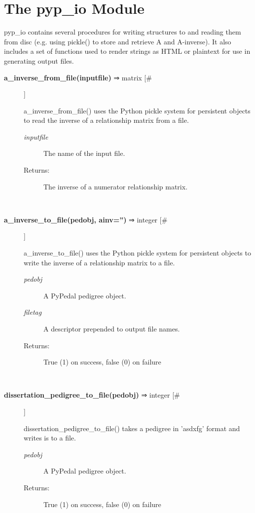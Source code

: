 \documentclass{article}
\begin{document}
\section*{The pyp\_io Module}
\par pyp\_io contains several procedures for writing structures to and reading them from
disc (e.g. using pickle() to store and retrieve A and A-inverse).  It also includes a set
of functions used to render strings as HTML or plaintext for use in generating output
files.
\begin{description}
\item[\textbf{a\_inverse\_from\_file(inputfile)} ⇒ matrix [\#]
]
\par a\_inverse\_from\_file() uses the Python pickle system for persistent objects to read the inverse of
a relationship matrix from a file.
\begin{description}
\item[\textit{inputfile}
]
The name of the input file.
\item[Returns:
]
The inverse of a numerator relationship matrix.
\end{description}\\

\item[\textbf{a\_inverse\_to\_file(pedobj, ainv='')} ⇒ integer [\#]
]
\par a\_inverse\_to\_file() uses the Python pickle system for persistent objects to write the
inverse of a relationship matrix to a file.
\begin{description}
\item[\textit{pedobj}
]
A PyPedal pedigree object.
\item[\textit{filetag}
]
A descriptor prepended to output file names.
\item[Returns:
]
True (1) on success, false (0) on failure
\end{description}\\

\item[\textbf{dissertation\_pedigree\_to\_file(pedobj)} ⇒ integer [\#]
]
\par dissertation\_pedigree\_to\_file() takes a pedigree in 'asdxfg' format and writes is to a file.
\begin{description}
\item[\textit{pedobj}
]
A PyPedal pedigree object.
\item[Returns:
]
True (1) on success, false (0) on failure
\end{description}\\


\end{description}
\end{document}
